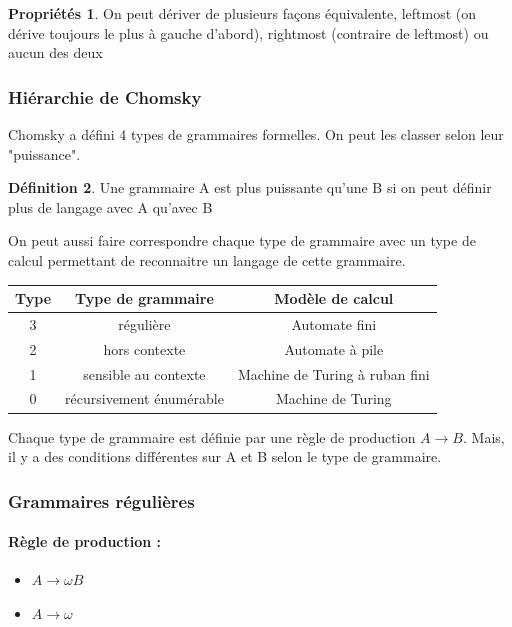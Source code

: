 \documentclass[11pt,a4paper]{article}
\theoremstyle{definition}
\newtheorem{mydef}{Définition}
\newtheorem{myprop}[mydef]{Propriétés}
\begin{document}
\begin{myprop}
	On peut dériver de plusieurs façons équivalente, leftmost (on dérive 
	toujours le plus à gauche d'abord), rightmost (contraire de leftmost) 
	ou  aucun des deux
\end{myprop}

\subsubsection{Hiérarchie de Chomsky}
\label{ssub:hi_rarchie_de_chomsky}

Chomsky a défini 4 types de grammaires formelles. On peut les classer selon 
leur "puissance".

\begin{mydef}
	Une grammaire A est plus puissante qu'une B si on peut définir plus 
	de langage avec A qu'avec B
\end{mydef}

On peut aussi faire correspondre chaque type de grammaire avec un type de 
calcul permettant de reconnaitre un langage de cette grammaire.

\begin{tabular}{|c|c|c|}
	\hline	
	 Type & Type de grammaire & Modèle de calcul\\
	 \hline
	3 & régulière & Automate fini \\
	2 & hors contexte & Automate à pile \\
	1 & sensible au contexte & Machine de Turing à ruban fini \\
	0 & récursivement énumérable & Machine de Turing \\
	\hline
\end{tabular}

Chaque type de grammaire est définie par une règle de production $A\rightarrow 
B$. Mais, il y a des conditions différentes sur A et B selon le type de 
grammaire.

\subsubsection{Grammaires régulières}

\paragraph{Règle de production :} 
\begin{itemize}
	\item $A \rightarrow \omega B$
	\item $A \rightarrow \omega$
\end{itemize}
\end{document}
